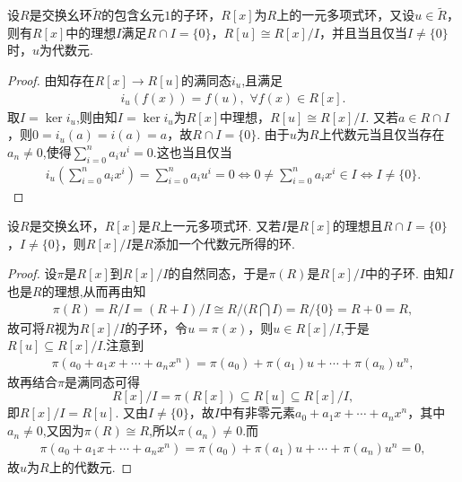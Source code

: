 \documentclass[../../main.tex]{subfiles}%
\begin{document}
\begin{corollary}\label{corollary:抽象代数--推论2.2.2}
设$R$是交换幺环$\widetilde{R}$的包含幺元$1$的子环，$R[x]$为$R$上的一元多项式环，又设$u\in\widetilde{R}$，则有$R[x]$中的理想$I$满足$R\cap I=\{0\}$，$R[u]\cong R[x]/I$，并且当且仅当$I\neq\{0\}$时，$u$为代数元.
\end{corollary}
\begin{proof}
由知存在$R[x]\to R[u]$的满同态$i_u$,且满足
\begin{align*}
i_u(f(x)) = f(u),\,\,\forall f(x)\in R[x].
\end{align*}
取$I=\ker i_u$,则由知$I=\ker i_u$为$R[x]$中理想，$R[u]\cong R[x]/I$. 又若$a\in R\cap I$，则$0=i_u(a)=i(a)=a$，故$R\cap I=\{0\}$. 由于$u$为$R$上代数元当且仅当存在$a_n\ne 0$,使得$\sum\limits_{i=0}^n a_iu^i=0$.这也当且仅当
\begin{align*}
i_u\left(\sum\limits_{i=0}^n a_ix^i\right)=\sum\limits_{i=0}^n a_iu^i=0 \iff 0\ne \sum\limits_{i=0}^n a_ix^i\in I \iff I\neq\{0\}.
\end{align*}
\end{proof}

\begin{corollary}\label{corollary:抽象代数--推论2.2.3}
设$R$是交换幺环，$R[x]$是$R$上一元多项式环. 又若$I$是$R[x]$的理想且$R\cap I=\{0\}$，$I\neq\{0\}$，则$R[x]/I$是$R$添加一个代数元所得的环.
\end{corollary}
\begin{proof}
设$\pi$是$R[x]$到$R[x]/I$的自然同态，于是$\pi(R)$是$R[x]/I$中的子环. 由知$I$也是$R$的理想,从而再由知
\begin{align*}
\pi (R)=R/I=\left( R+I \right) /I\cong R/(R\bigcap{I)}=R/\{0\}=R+0=R,
\end{align*}
故可将$R$视为$R[x]/I$的子环，令$u=\pi(x)$，则$u\in R[x]/I$,于是$R[u]\subseteq R[x]/I$.注意到
\begin{align*}
\pi(a_0+a_1x+\cdots+a_nx^n)=\pi(a_0)+\pi(a_1)u+\cdots+\pi(a_n)u^n,
\end{align*}
故再结合$\pi$是满同态可得
$$
R[x]/I=\pi(R[x])\subseteq R[u]\subseteq R[x]/I,
$$
即$R[x]/I=R[u]$. 又由$I\neq\{0\}$，故$I$中有非零元素$a_0+a_1x+\cdots+a_nx^n$，其中$a_n\ne 0$,又因为$\pi(R)\cong R$,所以$\pi(a_n)\ne 0$.而
\begin{align*}
\pi (a_0+a_1x+\cdots +a_nx^n)=\pi \left( a_0 \right) +\pi \left( a_1 \right) u+\cdots +\pi \left( a_n \right) u^n=0,
\end{align*}
故$u$为$R$上的代数元.
\end{proof}
\end{document}
